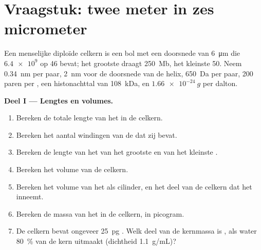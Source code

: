 \section{Vraagstuk: twee meter in zes micrometer}

\begin{problem}
\label{pb:b1:genomes:1}
Een menselijke diploïde celkern is een bol met een doorsnede van \qty{6}{\micro m}
die $\num{6.4e9}$  op 46  bevat; het grootste 
draagt \qty{250}{Mb}, het kleinste \qty{50}{}. Neem \qty{0.34}{nm} per paar,
\qty{2}{nm} voor de doorsnede van de helix, \qty{650}{Da} per paar, \num{200} paren
per , een histonachttal van \qty{108}{kDa}, en $\qty{1.66e-24}{g}$ per
dalton.

\medskip
\noindent\textbf{Deel I --- Lengtes en volumes.}
\begin{enumerate}
  \item Bereken de totale lengte van het  in de celkern.
  \item Bereken het aantal windingen van de  dat zij bevat.
  \item Bereken de lengte van het  van het grootste en van het kleinste
        .
  \item Bereken het volume van de celkern.
  \item Bereken het volume van het  als cilinder, en het deel van de
        celkern dat het inneemt.
  \item Bereken de massa van het  in de celkern, in picogram.
  \item De celkern bevat ongeveer \qty{25}{pg} . Welk deel van de
        kernmassa is , als water \qty{80}{\%} van de kern uitmaakt
        (dichtheid \qty{1.1}{g/mL})?
\end{enumerate}


\end{problem}
